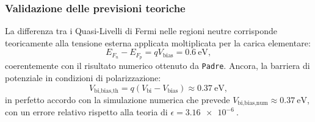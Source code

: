 \documentclass[a4paper,11pt]{report}
\begin{document}
\subsubsection{Validazione delle previsioni teoriche}
La differenza tra i Quasi-Livelli di Fermi nelle regioni neutre corrisponde teoricamente alla tensione esterna applicata moltiplicata per la carica elementare:
\begin{equation}
    E_{F_n} - E_{F_p} = q V_{\text{bias}} = \SI{0.6}{\electronvolt},
\end{equation}
coerentemente con il risultato numerico ottenuto da \texttt{Padre}. Ancora, la barriera di potenziale in condizioni di polarizzazione:
\begin{equation}
    V_{\text{bi,bias,th}} = q(V_{\text{bi}} - V_{\text{bias}}) \approx \SI{0.37}{\electronvolt},
    \label{eq:V_bi-V_bias}
\end{equation}
in perfetto accordo con la simulazione numerica che prevede $V_{\text{bi,bias,num}} \approx \SI{0.37}{\electronvolt}$, con un errore relativo rispetto alla teoria di $\epsilon = \SI{3.16e-6}{}$.\\
\end{document}
